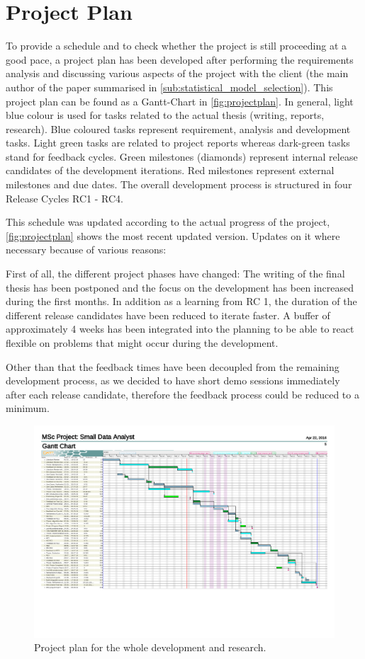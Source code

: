 \section{Project Plan}
\label{sec:projectplan}
To provide a schedule and to check whether the project is still proceeding at a good pace, a project plan has been developed after performing the requirements analysis and discussing various aspects of the project with the client (the main author of the paper summarised in \autoref{sub:statistical_model_selection}). This project plan can be found as a Gantt-Chart in \autoref{fig:projectplan}. In general, light blue colour is used for tasks related to the actual thesis (writing, reports, research). Blue coloured tasks represent requirement, analysis and development tasks. Light green tasks are related to project reports whereas dark-green tasks stand for feedback cycles. Green milestones (diamonds) represent internal release candidates of the development iterations. Red milestones represent external milestones and due dates. The overall development process is structured in four Release Cycles RC1 - RC4. 

This schedule was updated according to the actual progress of the project, \autoref{fig:projectplan} shows the most recent updated version. Updates on it where necessary because of various reasons:

First of all, the different project phases have changed: The writing of the final thesis has been postponed and the focus on the development has been increased during the first months. In addition as a learning from RC 1, the duration of the different release candidates have been reduced to iterate faster. A buffer of approximately 4 weeks has been integrated into the planning to be able to react flexible on problems that might occur during the development. 

Other than that the feedback times have been decoupled from the remaining development process, as we decided to have short demo sessions immediately after each release candidate, therefore the feedback process could be reduced to a minimum.

\begin{figure}
	\centering
	\includegraphics[width=\textwidth]{appendix/Projectplan}
	\caption{Project plan for the whole development and research.}
	\label{fig:projectplan}
\end{figure}
\restoregeometry
